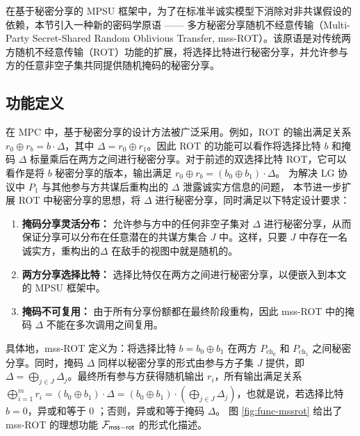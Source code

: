 在基于秘密分享的 MPSU 框架中，为了在标准半诚实模型下消除对非共谋假设的依赖，本节引入一种新的密码学原语 —— 多方秘密分享随机不经意传输（Multi-Party Secret-Shared Random Oblivious Transfer, mss-ROT）。该原语是对传统两方随机不经意传输（ROT）功能的扩展，将选择比特进行秘密分享，并允许参与方的任意非空子集共同提供随机掩码的秘密分享。

\subsection{功能定义}

在 MPC 中，基于秘密分享的设计方法被广泛采用。例如，ROT 的输出满足关系 $r_0 \oplus r_b = b \cdot \Delta$，其中 $\Delta = r_0 \oplus r_1$。因此 ROT 的功能可以看作将选择比特 $b$ 和掩码 $\Delta$ 标量乘后在两方之间进行秘密分享。对于前述的双选择比特 ROT，它可以看作是将 $b$ 秘密分享的版本，输出满足 $r_0 \oplus r_b = (b_0 \oplus b_1) \cdot \Delta$。
为解决 LG 协议中 $P_1$ 与其他参与方共谋后重构出的 $\Delta$ 泄露诚实方信息的问题，
本节进一步扩展 ROT 中秘密分享的思想，将 $\Delta$ 进行秘密分享，同时满足以下特定设计要求：
\begin{enumerate}
    \item \textbf{掩码分享灵活分布：} 允许参与方中的任何非空子集对 $\Delta$ 进行秘密分享，从而保证分享可以分布在任意潜在的共谋方集合 $J$ 中。这样，只要 $J$ 中存在一名诚实方，重构出的$\Delta$ 在敌手的视图中就是随机的。
    \item \textbf{两方分享选择比特：} 选择比特仅在两方之间进行秘密分享，以便嵌入到本文的 MPSU 框架中。
    \item \textbf{掩码不可复用：} 由于所有分享份额都在最终阶段重构，因此 mss-ROT 中的掩码 $\Delta$ 不能在多次调用之间复用。
\end{enumerate}
具体地，mss-ROT 定义为：将选择比特 $b = b_0 \oplus b_1$ 在两方 $P_{\text{ch}_0}$ 和 $P_{\text{ch}_1}$ 之间秘密分享。同时，掩码 $\Delta$ 同样以秘密分享的形式由参与方子集 $J$ 提供，即 $\Delta = \bigoplus_{j \in J} \Delta_j$。最终所有参与方获得随机输出 $r_i$，所有输出满足关系 $\bigoplus_{i=1}^m r_i = (b_0 \oplus b_1) \cdot \Delta = (b_0 \oplus b_1) \cdot (\bigoplus_{j \in J} \Delta_j)$，也就是说，若选择比特 $b = 0$，异或和等于 0 ；否则，异或和等于掩码 $\Delta$。
图 \ref{fig:func-mssrot} 给出了 mss-ROT 的理想功能 $\mathcal{F}_\mathsf{mss\mathsf{-}rot}$ 的形式化描述。


